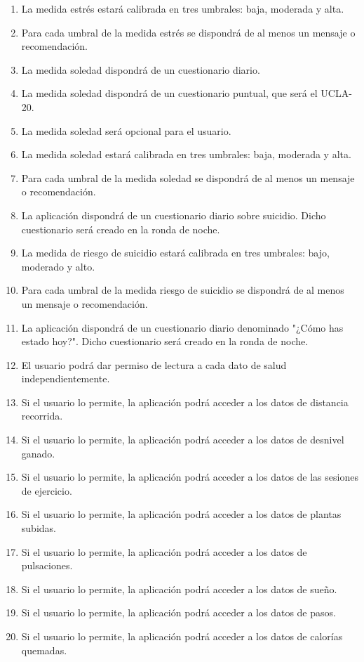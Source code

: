 \begin{enumerate}
    \item La medida estrés estará calibrada en tres umbrales: baja, moderada y alta.
    \item Para cada umbral de la medida estrés se dispondrá de al menos un mensaje o recomendación.
    \item La medida soledad dispondrá de un cuestionario diario.
    \item La medida soledad dispondrá de un cuestionario puntual, que será el UCLA-20.
    \item La medida soledad será opcional para el usuario.
    \item La medida soledad estará calibrada en tres umbrales: baja, moderada y alta.
    \item Para cada umbral de la medida soledad se dispondrá de al menos un mensaje o recomendación.
    \item La aplicación dispondrá de un cuestionario diario sobre suicidio. Dicho cuestionario será creado en la ronda de noche.
    \item La medida de riesgo de suicidio estará calibrada en tres umbrales: bajo, moderado y alto.
    \item Para cada umbral de la medida riesgo de suicidio  se dispondrá de al menos un mensaje o recomendación.
    \item La aplicación dispondrá de un cuestionario diario denominado "¿Cómo has estado hoy?". Dicho cuestionario será creado en la ronda de noche.
    \item El usuario podrá dar permiso de lectura a cada dato de salud independientemente.
    \item Si el usuario lo permite, la aplicación podrá acceder a los datos de distancia recorrida.
    \item Si el usuario lo permite, la aplicación podrá acceder a los datos de desnivel ganado.
    \item Si el usuario lo permite, la aplicación podrá acceder a los datos de las sesiones de ejercicio.
    \item Si el usuario lo permite, la aplicación podrá acceder a los datos de plantas subidas.
    \item Si el usuario lo permite, la aplicación podrá acceder a los datos de pulsaciones.
    \item Si el usuario lo permite, la aplicación podrá acceder a los datos de sueño.
    \item Si el usuario lo permite, la aplicación podrá acceder a los datos de pasos.
    \item Si el usuario lo permite, la aplicación podrá acceder a los datos de calorías quemadas.

\end{enumerate}

